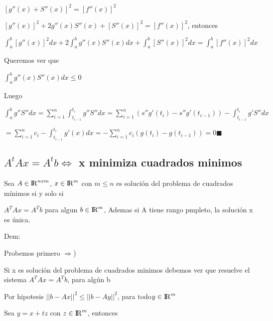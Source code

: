 \documentclass{article}
\begin{document}
\vspace{5mm}

$[g''(x) + S''(x)]^2 = [f''(x)]^2$

\vspace{5mm}

$[g''(x)]^2 + 2g''(x)S''(x) + [S''(x)]^2 = [f''(x)]^2$, entonces

\vspace{5mm}

$\displaystyle\int_{a}^{b}[g''(x)]^2dx + 2 \displaystyle\int_{a}^{b}g''(x)S''(x)dx + \displaystyle\int_{a}^{b}[S''(x)]^2dx = \displaystyle\int_{a}^{b}[f''(x)]^2dx $

Queremos ver que

$\displaystyle\int_{a}^{b}g''(x)S''(x)dx \leq 0$

Luego

$\displaystyle\int_{a}^{b}g''S''dx = \sum\limits_{i=1}^n \displaystyle\int_{t_{i-1}}^{t_i}g''S''dx = \sum\limits_{i=1}^n (s''g'(t_i)-s''g'(t_{i-1}))- \displaystyle\int_{t_{i-1}}^{t_i}g'S''dx $

\vspace{5mm}

$=\sum\limits_{i=1}^n c_i- \displaystyle\int_{t_{i-1}}^{t_i}g'(x)dx = -\sum\limits_{i=1}^n c_i(g(t_i)-g(t_{i-1}))=0$$\blacksquare$

\vspace{10mm}

\subsection{$A^tAx=A^tb\Leftrightarrow$  x minimiza cuadrados minimos}\label{Relacion-DIf-Divididas-con-derivada-n-esima}

Sea $A \in  {\rm I\!R}^{nxm}$, $x \in {\rm I\!R}^{m}$ con $m \leq n$ es solución del problema de cuadrados mínimos si y solo si

$A^TAx = A^Tb$ para algun $b \in {\rm I\!R}^{m}$, Ademas si A tiene rango pmpleto, la solución x es única.

Dem:

Probemos primero $\Rightarrow$)

Si x es solución del problema de cuadrados minimos debemos ver que resuelve el sistema $A^TAx = A^Tb$, para algún b

Por hipotesis $||b - Ax||^2 \leq ||b-Ay||^2$, para todo$y \in {\rm I\!R}^m$

Sea $y = x+ tz$ con $z \in {\rm I\!R}^m$, entonces

\vspace{5mm}
\end{document}
